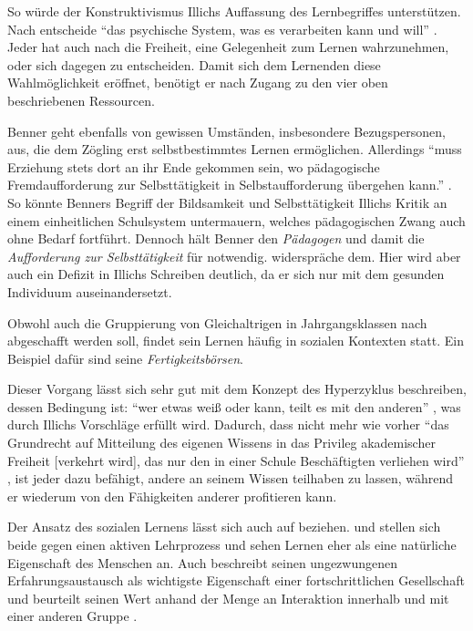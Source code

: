 So würde der Konstruktivismus Illichs Auffassung des Lernbegriffes unterstützen.
Nach \citeauthor{siebert-2003} entscheide ``das psychische System, was es verarbeiten kann und will'' \parencite[13]{siebert-2003}.
Jeder hat auch nach \citeauthor{Illich-1971} die Freiheit, eine Gelegenheit zum Lernen wahrzunehmen, oder sich dagegen zu entscheiden.
Damit sich dem Lernenden diese Wahlmöglichkeit eröffnet, benötigt er nach \citeauthor{Illich-1971} Zugang zu den vier oben beschriebenen Ressourcen.

Benner geht ebenfalls von gewissen Umständen, insbesondere Bezugspersonen, aus, die dem Zögling erst selbstbestimmtes Lernen ermöglichen.
Allerdings ``muss Erziehung stets dort an ihr Ende gekommen sein, wo pädagogische Fremdaufforderung zur Selbsttätigkeit in Selbstaufforderung übergehen kann.'' \parencite[91]{benner-2012}.
So könnte Benners Begriff der Bildsamkeit und Selbsttätigkeit Illichs Kritik an einem einheitlichen Schulsystem untermauern, welches pädagogischen Zwang auch ohne Bedarf fortführt.
Dennoch hält Benner den \emph{Pädagogen} und damit die \emph{Aufforderung zur Selbsttätigkeit} für notwendig.
\citeauthor{Illich-1971} widerspräche dem.
Hier wird aber auch ein Defizit in Illichs Schreiben deutlich, da er sich nur mit dem gesunden Individuum auseinandersetzt.

Obwohl auch die Gruppierung von Gleichaltrigen in Jahrgangsklassen nach \citeauthor{Illich-1971} abgeschafft werden soll, findet sein Lernen häufig in sozialen Kontexten statt.
Ein Beispiel dafür sind seine \emph{Fertigkeitsbörsen}.

Dieser Vorgang lässt sich sehr gut mit dem Konzept des Hyperzyklus beschreiben, dessen Bedingung ist: ``wer etwas weiß oder kann, teilt es mit den anderen'' \parencite[123]{Zimpel2012}, was durch Illichs Vorschläge erfüllt wird.
Dadurch, dass nicht mehr wie vorher ``das Grundrecht auf Mitteilung des eigenen Wissens in das Privileg akademischer Freiheit [verkehrt wird], das nur den in einer Schule Beschäftigten verliehen wird'' \parencite[97]{Illich-1971}, ist jeder dazu befähigt, andere an seinem Wissen teilhaben zu lassen, während er wiederum von den Fähigkeiten anderer profitieren kann.

Der Ansatz des sozialen Lernens lässt sich auch auf \citeauthor{Dewey2010} beziehen.
\citeauthor{Illich-1971} und \citeauthor{Dewey2010} stellen sich beide gegen einen aktiven Lehrprozess und sehen Lernen eher als eine natürliche Eigenschaft des Menschen an.
Auch \citeauthor{Dewey2010} beschreibt seinen ungezwungenen Erfahrungsaustausch als wichtigste Eigenschaft einer fortschrittlichen Gesellschaft und beurteilt seinen Wert anhand der Menge an Interaktion innerhalb und mit einer anderen Gruppe \parencite[vgl.][89]{Dewey2010}.

